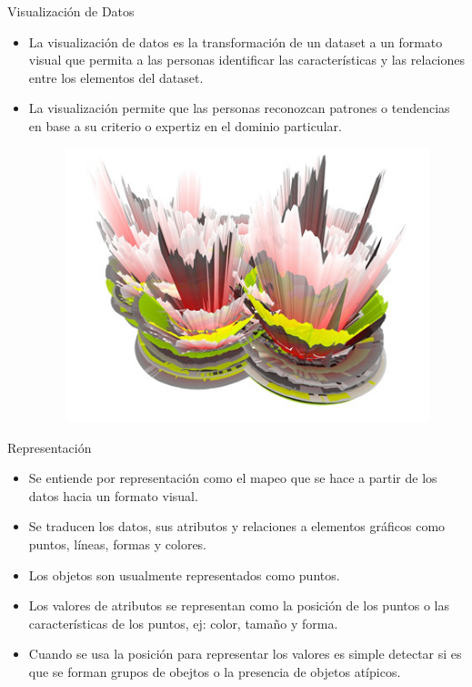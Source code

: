 \documentclass[handout]{beamer}
\begin{document}
\begin{frame}[fragile]{Visualización de Datos}
\scriptsize{
\begin{itemize}
 \item La visualización de datos es la transformación de un dataset a un formato visual que permita a las personas identificar las características y las relaciones entre los elementos del dataset.
 
 \item La visualización permite que las personas reconozcan patrones o tendencias en base a su criterio o expertiz en el dominio particular.
 
   \begin{figure}[h!]
	\centering
	\includegraphics[scale=0.38]{imagenes/visua.jpg}
	
	
\end{figure} 
 
\end{itemize}

}
 
\end{frame}

\begin{frame}{Representación}
\scriptsize{
\begin{itemize}
 \item Se entiende por representación como el mapeo que se hace a partir de los datos hacia un formato visual.
 \item Se traducen los datos, sus atributos y relaciones a elementos gráficos como puntos, líneas, formas y colores. 
  \item Los objetos son usualmente representados como puntos.
  \item Los valores de atributos se representan como la posición de los puntos o las características de los puntos, ej: color, tamaño y forma.
  \item Cuando se usa la posición para representar los valores es simple detectar si es que se forman grupos de obejtos o la presencia de objetos atípicos. 
  
 
 
\end{itemize}
 
 

 
}
\end{frame}
\end{document}
